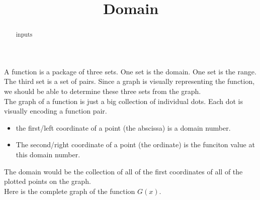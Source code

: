 \documentclass{ximera}
\title{Domain}
\begin{document}
\begin{abstract}
inputs
\end{abstract}
\maketitle


A function is a package of three sets.  One set is the domain. One set is the range. The third set is a set of pairs. Since a graph is visually representing the function, we should be able to determine these three sets from the graph.\\


The graph of a function is just a big collection of individual dots. Each dot is visually encoding a function pair. \\



\begin{itemize}
     \item the first/left coordinate of a point (the abscissa) is a domain number.
     \item The second/right coordinate of a point (the ordinate) is  the funciton value at this domain number.
\end{itemize}



The domain would be the collection of all of the first coordinates of all of the plotted points on the graph. \\






Here is the complete graph of the function $G(x)$. \\
\end{document}
